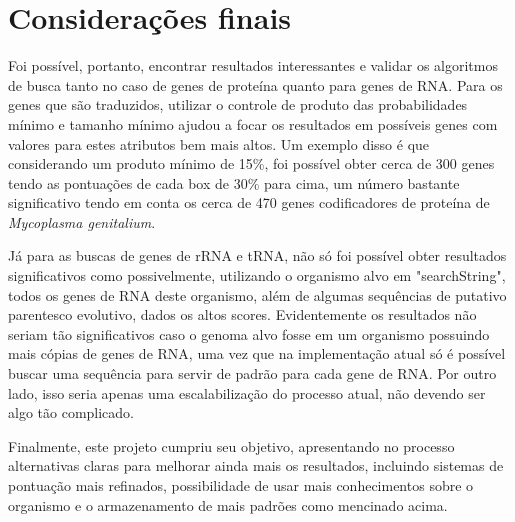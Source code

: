 \documentclass[brazilian,12pt,a4paper,final]{article}
\begin{document}
	\section{Considerações finais}
	Foi possível, portanto, encontrar resultados interessantes e validar os algoritmos de busca tanto no caso de genes de proteína quanto para genes de RNA. Para os genes que são traduzidos, utilizar o controle de produto das probabilidades mínimo e tamanho mínimo ajudou a focar os resultados em possíveis genes com valores para estes atributos bem mais altos. Um exemplo disso é que considerando um produto mínimo de 15\%, foi possível obter cerca de 300 genes tendo as pontuações de cada box de 30\% para cima, um número bastante significativo tendo em conta os cerca de 470 genes codificadores de proteína de \textit{Mycoplasma genitalium}.
	
	\vspace{0.5cm}
	
	Já para as buscas de genes de rRNA e tRNA, não só foi possível obter resultados significativos como possivelmente, utilizando o organismo alvo em "searchString", todos os genes de RNA deste organismo, além de algumas sequências de putativo parentesco evolutivo, dados os altos scores. Evidentemente os resultados não seriam tão significativos caso o genoma alvo fosse em um organismo possuindo mais cópias de genes de RNA, uma vez que na implementação atual só é possível buscar uma sequência para servir de padrão para cada gene de RNA. Por outro lado, isso seria apenas uma escalabilização do processo atual, não devendo ser algo tão complicado.
	
	\vspace{0.5cm}
	
	Finalmente, este projeto cumpriu seu objetivo, apresentando no processo alternativas claras para melhorar ainda mais os resultados, incluindo sistemas de pontuação mais refinados, possibilidade de usar mais conhecimentos sobre o organismo e o armazenamento de mais padrões como mencinado acima. 
	
	
	
\end{document}
